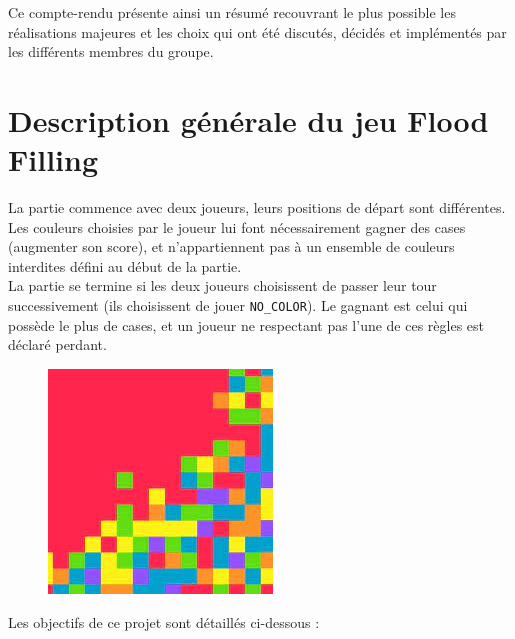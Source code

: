 \documentclass[11pt]{article}
\begin{document}
Ce compte-rendu présente ainsi un résumé recouvrant le plus possible les réalisations majeures et les choix qui ont été discutés, décidés et implémentés par les différents membres du groupe.

%
\section{Description générale du jeu Flood Filling}

La partie commence avec deux joueurs, leurs positions de départ sont différentes. Les couleurs choisies par le joueur lui font nécessairement gagner des cases (augmenter son score), et n'appartiennent pas à un ensemble de couleurs interdites défini au début de la partie.\\
La partie se termine si les deux joueurs choisissent de passer leur tour successivement (ils choisissent de jouer \texttt{NO\_COLOR}). Le gagnant est celui qui possède le plus de cases, et un joueur ne respectant pas l'une de ces règles est déclaré perdant.\\
\begin{figure}[h!]
    \begin{center}
        \includegraphics[scale=0.4]{./img/flood_it.jpeg}
    \end{center}
\end{figure}
\newline 
Les objectifs de ce projet sont détaillés ci-dessous :\\
\end{document}
